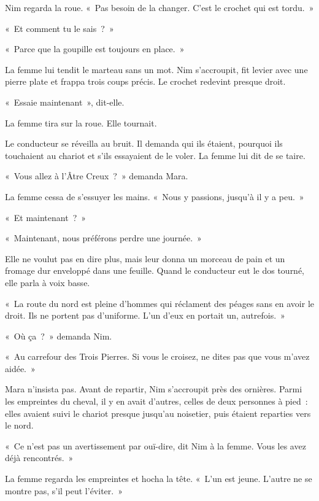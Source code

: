 \documentclass[10pt,a4paper]{article}
\begin{document}
Nim regarda la roue. «~Pas besoin de la changer. C’est le crochet qui est tordu.~»

«~Et comment tu le sais~?~»

«~Parce que la goupille est toujours en place.~»

La femme lui tendit le marteau sans un mot. Nim s’accroupit, fit levier avec une pierre plate et frappa trois coups précis. Le crochet redevint presque droit.

«~Essaie maintenant~», dit-elle.

La femme tira sur la roue. Elle tournait.

Le conducteur se réveilla au bruit. Il demanda qui ils étaient, pourquoi ils touchaient au chariot et s’ils essayaient de le voler. La femme lui dit de se taire.

«~Vous allez à l’Âtre Creux~?~» demanda Mara.

La femme cessa de s’essuyer les mains. «~Nous y passions, jusqu’à il y a peu.~»

«~Et maintenant~?~»

«~Maintenant, nous préférons perdre une journée.~»

Elle ne voulut pas en dire plus, mais leur donna un morceau de pain et un fromage dur enveloppé dans une feuille. Quand le conducteur eut le dos tourné, elle parla à voix basse.

«~La route du nord est pleine d’hommes qui réclament des péages sans en avoir le droit. Ils ne portent pas d’uniforme. L’un d’eux en portait un, autrefois.~»

«~Où ça~?~» demanda Nim.

«~Au carrefour des Trois Pierres. Si vous le croisez, ne dites pas que vous m’avez aidée.~»

Mara n’insista pas. Avant de repartir, Nim s’accroupit près des ornières. Parmi les empreintes du cheval, il y en avait d’autres, celles de deux personnes à pied~: elles avaient suivi le chariot presque jusqu’au noisetier, puis étaient reparties vers le nord.

«~Ce n’est pas un avertissement par ouï-dire, dit Nim à la femme. Vous les avez déjà rencontrés.~»

La femme regarda les empreintes et hocha la tête. «~L’un est jeune. L’autre ne se montre pas, s’il peut l’éviter.~»
\end{document}
